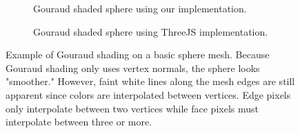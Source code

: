 \documentclass[10pt,twocolumn,letterpaper]{article}
\begin{document}
\begin{figure}
    \centering
    \begin{subfigure}{.48\linewidth}
        \caption{Gouraud shaded sphere using our implementation.}
        \label{fig:our-gouraud-sphere}
    \end{subfigure}
    \hfill
    \begin{subfigure}{.48\linewidth}
        \caption{Gouraud shaded sphere using ThreeJS implementation.}
        \label{fig:three-gouraud-sphere}
    \end{subfigure}
    \caption{Example of Gouraud shading on a basic sphere mesh. Because Gouraud shading only uses vertex normals, the sphere looks "smoother." However, faint white lines along the mesh edges are still apparent since colors are interpolated between vertices. Edge pixels only interpolate between two vertices while face pixels must interpolate between three or more.}
    \label{fig:gouraud-sphere}
\end{figure}
\end{document}
